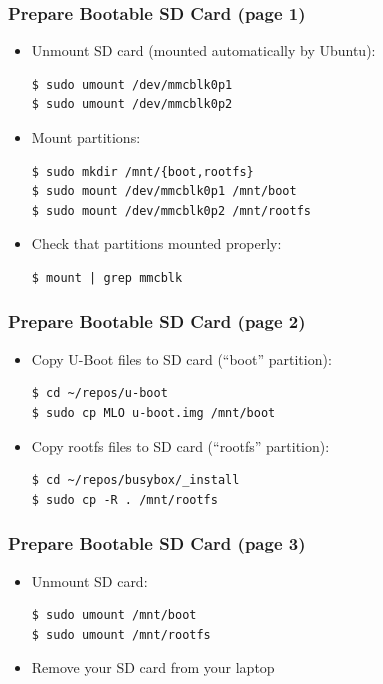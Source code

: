 \documentclass[aspectratio=169]{beamer}
\begin{document}
\begin{frame}[fragile]
  \frametitle{Prepare Bootable SD Card (page 1)}
  \begin{itemize}
    \item Unmount SD card (mounted automatically by Ubuntu):
      \begin{verbatim}
$ sudo umount /dev/mmcblk0p1
$ sudo umount /dev/mmcblk0p2
      \end{verbatim}
    \item Mount partitions:
      \begin{verbatim}
$ sudo mkdir /mnt/{boot,rootfs}
$ sudo mount /dev/mmcblk0p1 /mnt/boot
$ sudo mount /dev/mmcblk0p2 /mnt/rootfs
      \end{verbatim}
    \item Check that partitions mounted properly:
      \begin{verbatim}
$ mount | grep mmcblk
      \end{verbatim}
  \end{itemize}
  \vspace*{-5mm} %
\end{frame}

\begin{frame}[fragile]
  \frametitle{Prepare Bootable SD Card (page 2)}
  \begin{itemize}
    \item Copy U-Boot files to SD card (``boot'' partition):
      \begin{verbatim}
$ cd ~/repos/u-boot
$ sudo cp MLO u-boot.img /mnt/boot
      \end{verbatim}
    \item Copy rootfs files to SD card (``rootfs'' partition):
      \begin{verbatim}
$ cd ~/repos/busybox/_install
$ sudo cp -R . /mnt/rootfs
      \end{verbatim}
  \end{itemize}
\end{frame}

\begin{frame}[fragile]
  \frametitle{Prepare Bootable SD Card (page 3)}
  \begin{itemize}
    \item Unmount SD card:
      \begin{verbatim}
$ sudo umount /mnt/boot
$ sudo umount /mnt/rootfs
      \end{verbatim}
    \item Remove your SD card from your laptop
  \end{itemize}
\end{frame}
\end{document}
